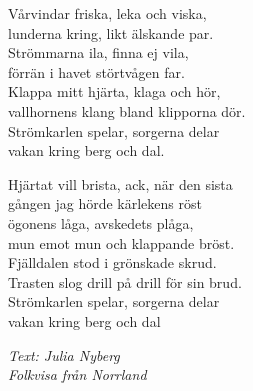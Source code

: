 \vspace{10pt}
Vårvindar friska, leka och viska,\\
lunderna kring, likt älskande par.\\
Strömmarna ila, finna ej vila,\\
förrän i havet störtvågen far.\\
Klappa mitt hjärta, klaga och hör,\\
vallhornens klang bland klipporna dör.\\
Strömkarlen spelar, sorgerna delar\\
vakan kring berg och dal.\par
\vspace{10pt}
Hjärtat vill brista, ack, när den sista \\
gången jag hörde kärlekens röst\\
ögonens låga, avskedets plåga,\\
mun emot mun och klappande bröst.\\
Fjälldalen stod i grönskade skrud.\\
Trasten slog drill på drill för sin brud.\\
Strömkarlen spelar, sorgerna delar\\
vakan kring berg och dal
\par
\vspace{10pt}
{\footnotesize\textit{Text: Julia Nyberg\\ Folkvisa från Norrland}}
